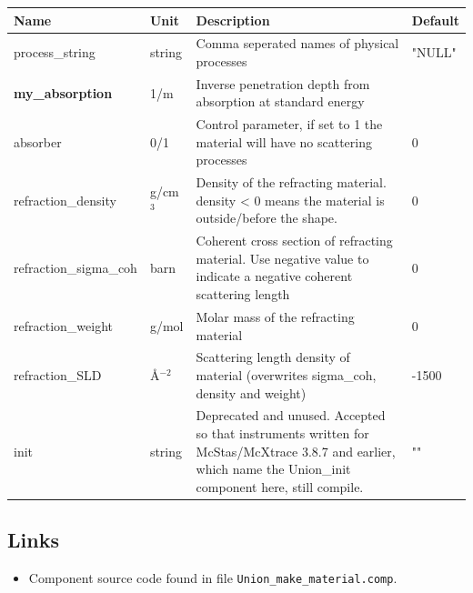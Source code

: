 \begin{longtable}{p{}p{}p{}p{}}
\toprule
\textbf{Name} & \textbf{Unit} & \textbf{Description} & \textbf{Default} \\
\midrule
\endhead
process\_string & string & Comma seperated names of physical processes & "NULL" \\
\textbf{my\_absorption} & 1/m & Inverse penetration depth from absorption at standard energy &  \\
absorber & 0/1 & Control parameter, if set to 1 the material will have no scattering processes & 0 \\
refraction\_density & g/cm$^{3}$ & Density of the refracting material. density \textless{} 0 means the material is outside/before the shape. & 0 \\
refraction\_sigma\_coh & barn & Coherent cross section of refracting material. Use negative value to indicate a negative coherent scattering length & 0 \\
refraction\_weight & g/mol & Molar mass of the refracting material & 0 \\
refraction\_SLD & \AA{}$^{-2}$ & Scattering length density of material (overwrites sigma\_coh, density and weight) & -1500 \\
init & string & Deprecated and unused. Accepted so that instruments written for McStas/McXtrace 3.8.7 and earlier, which name the Union\_init component here, still compile. & "" \\
\bottomrule
\end{longtable}

\subsection*{Links}
\begin{itemize}
  \item Component source code found in file \texttt{Union\_make\_material.comp}.
\end{itemize}
